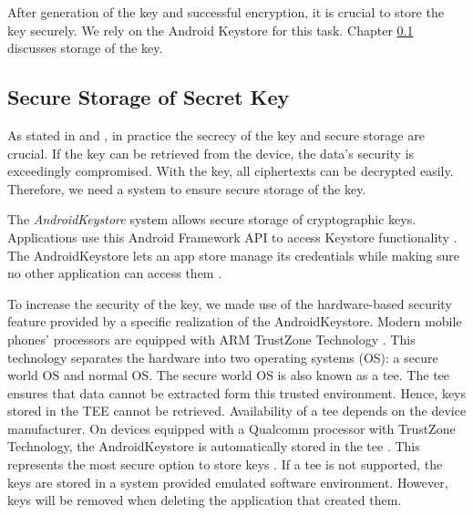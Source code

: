 After generation of the key and successful encryption, it is crucial to store the key securely. We rely on the Android Keystore for this task. Chapter \ref{arch_keystore} discusses storage of the key. \\



\subsection{Secure Storage of Secret Key} \label{arch_keystore}
As stated in \cite{dworkin2007sp} and \cite{DBLP:conf/ccs/CooijmansRP14},  in practice the secrecy of the key and secure storage are crucial. If the key can be retrieved from the device, the data's security is exceedingly compromised. With the key, all ciphertexts can be decrypted easily. Therefore, we need a system to ensure secure storage of the key.

The \textit{AndroidKeystore} system allows secure storage of cryptographic keys. Applications use this Android Framework API  to access Keystore functionality \cite{HWBKeyStore}. The AndroidKeystore lets an app store manage its credentials while making sure no other application can access them \cite{AndroidKeyStoreSystem}.

To increase the security of the key, we made use of the hardware-based security feature provided by a specific realization of the AndroidKeystore. Modern mobile phones' processors are equipped with ARM TrustZone Technology \cite{DBLP:conf/ccs/CooijmansRP14}. This technology separates the hardware into two operating systems (OS): a secure world OS and normal OS. The secure world OS is also known as a \gls{tee}. The \gls{tee} ensures that data cannot be extracted form this trusted environment. Hence, keys stored in the TEE cannot be retrieved. Availability of a \gls{tee} depends on the device manufacturer. On devices equipped with a Qualcomm processor with TrustZone Technology, the AndroidKeystore is automatically stored in the \gls{tee} \cite{DBLP:conf/ccs/CooijmansRP14}. This represents the most secure option to store keys \cite{SecureDataEncryption}. If a \gls{tee} is not supported, the keys are stored in a system provided emulated software environment. However, keys will be removed when deleting the application that created them.

